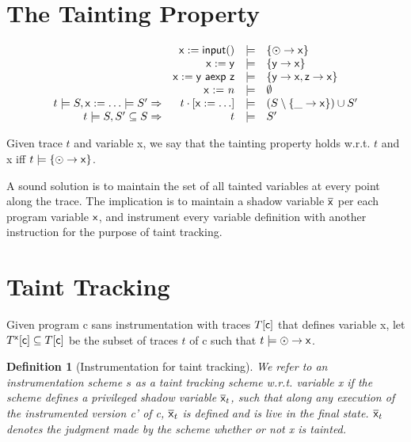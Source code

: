 \documentclass[]{article}
\newtheorem{defn}{Definition}
\begin{document}
\section{The Tainting Property}

$$
\begin{array}{rrcl}
& {\sf x := input()} & \models & \{ \odot \rightarrow {\sf x} \} \\
& {\sf x := y} & \models & \{ {\sf y} \rightarrow {\sf x} \}\\
& {\sf x := y\ aexp\ z} & \models & \{ {\sf y} \rightarrow {\sf x},{\sf z} \rightarrow {\sf x} \} \\
& \textsf{x := $n$} & \models & \emptyset\\
t \models S,{\sf x := \ldots} \models S' \Rightarrow & t \cdot [{\sf x := \ldots}] & \models & (S \setminus \{ \_ \rightarrow {\sf x} \}) \cup S' \\
t \models S,S' \subseteq S \Rightarrow & t & \models & S' \\
\end{array}
$$

Given trace $t$ and variable {\sf x}, we say that the tainting property holds w.r.t. $t$ and {\sf x} iff $t \models \{ \odot \rightarrow {\sf x} \}$.

A sound solution is to maintain the set of all tainted variables at every point along the trace. The implication is to maintain a shadow variable $\overline{{\sf x}}$ per each program variable ${\sf x}$, and instrument every variable definition with another instruction for the purpose of taint tracking. 

\section{Taint Tracking}

Given program {\sf c} sans instrumentation with traces $T[{\sf c}]$ that defines variable {\sf x}, let $T^{\sf x}[{\sf c}] \subseteq T[{\sf c}]$ be the subset of traces $t$ of {\sf c} such that $t \models \odot \rightarrow {\sf x}$.

\begin{defn}[Instrumentation for taint tracking] We refer to an instrumentation scheme $s$ as a \emph{taint tracking scheme} w.r.t. variable {\sf x} if 
the scheme defines a privileged shadow variable $\overline{\sf x}_t$, such that 
along any execution of the instrumented version {\sf c'} of {\sf c}, $\overline{\sf x}_t$ is defined and is live in the final state. $\overline{\sf x}_t$ denotes the judgment made by the scheme whether or not {\sf x} is tainted.
\end{defn}
\end{document}
